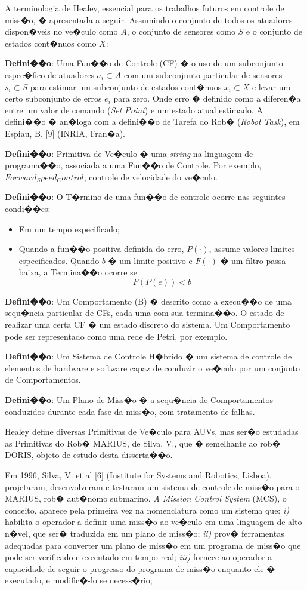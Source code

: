 A terminologia de Healey, essencial para os trabalhos futuros em controle de
miss�o, � apresentada a seguir. Assumindo o conjunto de todos os atuadores
dispon�veis no ve�culo como $A$, o conjunto de sensores como $S$ e o conjunto de estados
cont�nuos como $X$:

\textbf{Defini��o}: Uma Fun��o de Controle (CF) � o uso de um subconjunto
espec�fico de atuadores $a_i \subset A$ com um subconjunto particular de
sensores $s_i \subset S$ para estimar um subconjunto de estados cont�nuos $x_i
\subset X$ e levar um certo subconjunto de erros $e_i$ para zero. Onde erro �
definido como a diferen�a entre um valor de comando (\emph{Set Point}) e um
estado atual estimado. A defini��o � an�loga com a defini��o de Tarefa do Rob�
(\emph{Robot Task}), em Espiau, B. [9] (INRIA, Fran�a).

\textbf{Defini��o}: Primitiva de Ve�culo � uma \emph{string} na linguagem de
programa��o, associada a uma Fun��o de Controle. Por exemplo,
$Forward_Speed_Control$, controle de velocidade do ve�culo.

\textbf{Defini��o}: O T�rmino de uma fun��o de controle ocorre nas seguintes
condi��es:
\begin{itemize}
  \item Em um tempo especificado;
  \item Quando a fun��o positiva definida do erro, $P(\cdot)$, assume valores
  limites especificados. Quando $b$ � um limite positivo e $F(\cdot)$ � um
  filtro passa-baixa, a Termina��o ocorre se
  $$F(P(e)) < b$$
\end{itemize}  
\textbf{Defini��o}: Um Comportamento (B) � descrito como a execu��o de uma
sequ�ncia particular de CFs, cada uma com sua termina��o. O estado de realizar
uma certa CF � um estado discreto do sistema. Um Comportamento pode ser
representado como uma rede de Petri, por exemplo.

\textbf{Defini��o}: Um Sistema de Controle H�brido � um sistema de controle de
elementos de hardware e software capaz de conduzir o ve�culo por um conjunto de
Comportamentos.

\textbf{Defini��o}: Um Plano de Miss�o � a sequ�ncia de Comportamentos
conduzidos durante cada fase da miss�o, com tratamento de falhas.

Healey define diversas Primitivas de Ve�culo para AUVs, mas ser�o estudadas as
Primitivas do Rob� MARIUS, de Silva, V., que � semelhante ao rob� DORIS,
objeto de estudo desta disserta��o.

Em 1996, Silva, V. et al [6] (Institute for Systems and Robotics, Lisboa),
projetaram, desenvolveram e testaram um sistema de controle de miss�o para o
MARIUS, rob� aut�nomo submarino. \emph{A Mission Control System} (MCS), o
conceito, aparece pela primeira vez na nomenclatura como um sistema que:
\emph{i)} habilita o operador a definir uma miss�o ao ve�culo em uma linguagem
de alto n�vel, que ser� traduzida em um plano de miss�o; \emph{ii)} prov�
ferramentas adequadas para converter um plano de miss�o em um programa de
miss�o que pode ser verificado e executado em tempo real; \emph{iii)} fornece
ao operador a capacidade de seguir o progresso do programa de miss�o enquanto
ele � executado, e modific�-lo se necess�rio;


